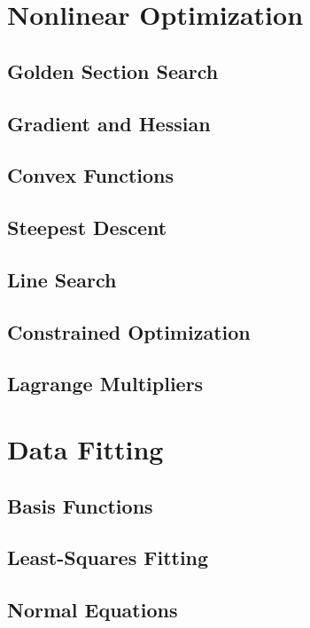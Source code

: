 \documentclass[11pt]{article}
\begin{document}
\section{Nonlinear Optimization}
\label{sec:orga5a468b}
\subsection{Golden Section Search}
\label{sec:orgea84fa0}
\subsection{Gradient and Hessian}
\label{sec:org8fcf7bb}
\subsection{Convex Functions}
\label{sec:org72a699d}
\subsection{Steepest Descent}
\label{sec:orgfafea7f}
\subsection{Line Search}
\label{sec:orge1f92cc}
\subsection{Constrained Optimization}
\label{sec:orgd2307a7}
\subsection{Lagrange Multipliers}
\label{sec:org0d6b278}

\section{Data Fitting}
\label{sec:org09bf7c3}
\subsection{Basis Functions}
\label{sec:orgc00e764}
\subsection{Least-Squares Fitting}
\label{sec:org0bd9f53}
\subsection{Normal Equations}
\label{sec:orgc0ff6db}
\end{document}
